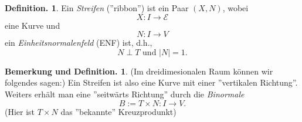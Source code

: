 \documentclass[a4paper,oneside,11pt,DIV=12,parskip=half]{scrartcl}
\newcommand{\E}{\mathcal E}
\theoremstyle{plain}
\theoremstyle{definition}
\newtheorem{definition}[theorem]{Definition.}
\newtheorem{remark, definition}[theorem]{Bemerkung und Definition.}
\newtheorem{lemma, definition}[theorem]{Lemma und Definition.}
\theoremstyle{remark}
\newtheorem*{remark, example}{\textbf{Bemerkung und Beispiel}}
\begin{document}
\begin{definition}
	Ein \emph{Streifen} (''ribbon'') ist ein Paar $(X,N)$, wobei $$X:I \rightarrow \E$$ eine Kurve und $$ N: I \rightarrow V $$ ein \emph{Einheitsnormalenfeld} (ENF) ist, d.h.,
	\[N\perp T \text{ und } |N|=1. \]
\end{definition}

\begin{remark, definition}
	(Im dreidimesionalen Raum können wir folgendes sagen:)
	Ein Streifen ist also eine Kurve mit einer ''vertikalen Richtung''.
	Weiters erhält man eine ''seitwärts Richtung'' durch die \emph{Binormale} $$B:=T\times N : I\rightarrow V.$$ (Hier ist $T \times N$ das ''bekannte'' Kreuzprodunkt)
	
\end{remark, definition}
\end{document}
